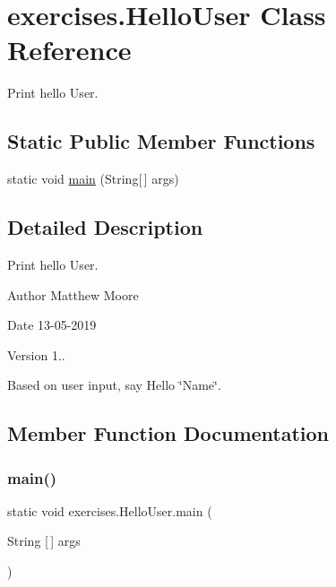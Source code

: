 \hypertarget{classexercises_1_1_hello_user}{}\section{exercises.\+Hello\+User Class Reference}
\label{classexercises_1_1_hello_user}


Print hello \textquotesingle{}User\textquotesingle{}.  


\subsection*{Static Public Member Functions}
\begin{DoxyCompactItemize}
\item 
static void \mbox{\hyperlink{classexercises_1_1_hello_user_a95cd13d52ba06b634de7116ff1bcbada}{main}} (String\mbox{[}$\,$\mbox{]} args)
\end{DoxyCompactItemize}


\subsection{Detailed Description}
Print hello \textquotesingle{}User\textquotesingle{}. 

\begin{DoxyAuthor}{Author}
Matthew Moore 
\end{DoxyAuthor}
\begin{DoxyDate}{Date}
13-\/05-\/2019 
\end{DoxyDate}
\begin{DoxyVersion}{Version}
1..
\end{DoxyVersion}
Based on user input, say \textquotesingle{}Hello \char`\"{}\+Name\char`\"{}\textquotesingle{}. 

\subsection{Member Function Documentation}
\mbox{\label{classexercises_1_1_hello_user_a95cd13d52ba06b634de7116ff1bcbada}} 
\subsubsection{\texorpdfstring{main()}{main()}}
{\footnotesize\ttfamily static void exercises.\+Hello\+User.\+main (\begin{DoxyParamCaption}\item[{String \mbox{[}$\,$\mbox{]}}]{args }\end{DoxyParamCaption})\hspace{0.3cm}{\ttfamily [static]}}

